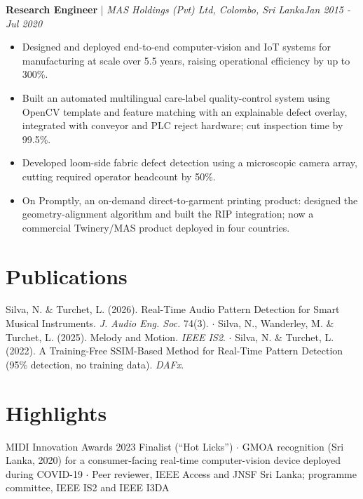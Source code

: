 \documentclass[11pt]{article}
\newenvironment{cvrole}[5]{%
  \par\noindent\textbf{\large #1} | \textit{\small #2, #3}\hfill \textit{\small #4 - #5}\par
  \begin{itemize}[leftmargin=2em, itemsep=-0.3em, topsep=-0.5em]%
}{%
  \end{itemize}\par\noindent\mbox{}\par\vspace{0.1em}%
}
\begin{document}
\begin{cvrole}{Research Engineer}{MAS Holdings (Pvt) Ltd}{Colombo, Sri Lanka}{Jan 2015}{Jul 2020}
    \item Designed and deployed end-to-end computer-vision and IoT systems for manufacturing at scale over 5.5 years, raising operational efficiency by up to 300\%.
    \item Built an automated multilingual care-label quality-control system using OpenCV template and feature matching with an explainable defect overlay, integrated with conveyor and PLC reject hardware; cut inspection time by 99.5\%.
    \item Developed loom-side fabric defect detection using a microscopic camera array, cutting required operator headcount by 50\%.
    \item On Promptly, an on-demand direct-to-garment printing product: designed the geometry-alignment algorithm and built the RIP integration; now a commercial Twinery/MAS product deployed in four countries.
\end{cvrole}

\section*{Publications}
Silva, N. \& Turchet, L. (2026). Real-Time Audio Pattern Detection for Smart Musical Instruments. \textit{J. Audio Eng. Soc.} 74(3). $\cdot$ Silva, N., Wanderley, M. \& Turchet, L. (2025). Melody and Motion. \textit{IEEE IS2}. $\cdot$ Silva, N. \& Turchet, L. (2022). A Training-Free SSIM-Based Method for Real-Time Pattern Detection (95\% detection, no training data). \textit{DAFx}.

\enlargethispage{5\baselineskip}
\section*{Highlights}
MIDI Innovation Awards 2023 Finalist (``Hot Licks'') $\cdot$ GMOA recognition (Sri Lanka, 2020) for a consumer-facing real-time computer-vision device deployed during COVID-19 $\cdot$ Peer reviewer, IEEE Access and JNSF Sri Lanka; programme committee, IEEE IS2 and IEEE I3DA
\end{document}
